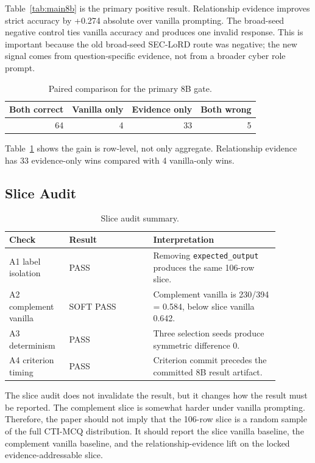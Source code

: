 \documentclass[10pt]{article}
\begin{document}
Table~\ref{tab:main8b} is the primary positive result.
Relationship evidence improves strict accuracy by +0.274 absolute over vanilla prompting.
The broad-seed negative control ties vanilla accuracy and produces one invalid response.
This is important because the old broad-seed SEC-LoRD route was negative; the new signal comes from question-specific evidence, not from a broader cyber role prompt.

\begin{table}[t]
  \centering
  \caption{Paired comparison for the primary 8B gate.}
  \label{tab:paired8b}
  \begin{tabular}{rrrr}
    \toprule
    Both correct & Vanilla only & Evidence only & Both wrong \\
    \midrule
    64 & 4 & 33 & 5 \\
    \bottomrule
  \end{tabular}
\end{table}

Table~\ref{tab:paired8b} shows the gain is row-level, not only aggregate.
Relationship evidence has 33 evidence-only wins compared with 4 vanilla-only wins.

\subsection{Slice Audit}

\begin{table}[t]
  \centering
  \caption{Slice audit summary.}
  \label{tab:sliceaudit}
  \begin{tabular}{p{0.18\linewidth}p{0.28\linewidth}p{0.42\linewidth}}
    \toprule
    Check & Result & Interpretation \\
    \midrule
    A1 label isolation & PASS & Removing \texttt{expected\_output} produces the same 106-row slice. \\
    A2 complement vanilla & SOFT PASS & Complement vanilla is 230/394 = 0.584, below slice vanilla 0.642. \\
    A3 determinism & PASS & Three selection seeds produce symmetric difference 0. \\
    A4 criterion timing & PASS & Criterion commit precedes the committed 8B result artifact. \\
    \bottomrule
  \end{tabular}
\end{table}

The slice audit does not invalidate the result, but it changes how the result must be reported.
The complement slice is somewhat harder under vanilla prompting.
Therefore, the paper should not imply that the 106-row slice is a random sample of the full CTI-MCQ distribution.
It should report the slice vanilla baseline, the complement vanilla baseline, and the relationship-evidence lift on the locked evidence-addressable slice.
\end{document}
